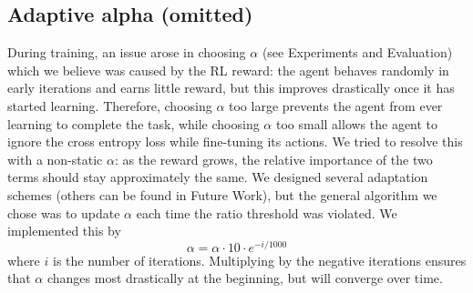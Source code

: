 \subsection{Adaptive alpha (omitted)}
During training, an issue arose in choosing $\alpha$ (see Experiments and Evaluation) which we believe was caused by the RL reward: the agent behaves randomly in early iterations and earns little reward, but this improves drastically once it has started learning. Therefore, choosing $\alpha$ too large prevents the agent from ever learning to complete the task, while choosing $\alpha$ too small allows the agent to ignore the cross entropy loss while fine-tuning its actions. We tried to resolve this with a non-static $\alpha$: as the reward grows, the relative importance of the two terms should stay approximately the same. We designed several adaptation schemes (others can be found in Future Work), but the general algorithm we chose was to update $\alpha$ each time the ratio threshold was violated. We implemented this by
\begin{equation}
    \alpha = \alpha \cdot 10 \cdot e^{-i / 1000}
\end{equation}
where $i$ is the number of iterations. Multiplying by the negative iterations ensures that $\alpha$ changes most drastically at the beginning, but will converge over time.